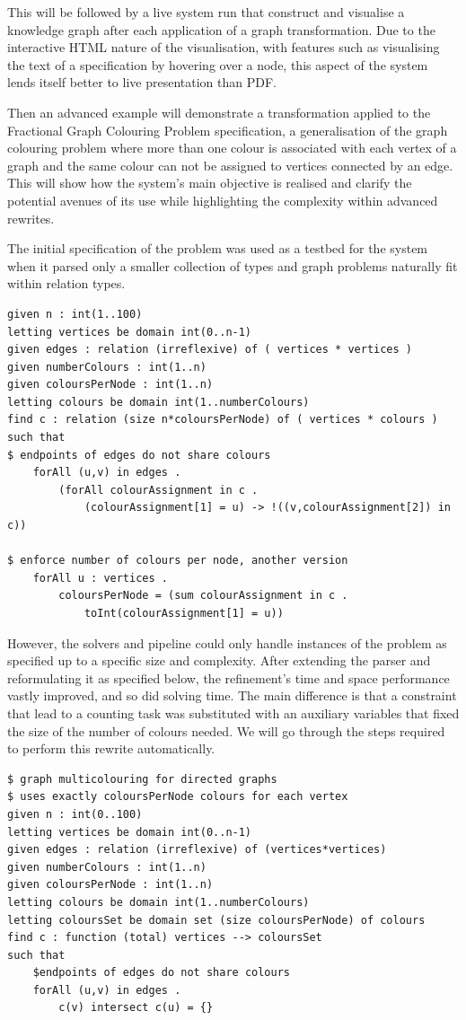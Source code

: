 \documentclass[runningheads]{llncs}
\begin{document}
This will be followed by a live system run that construct and visualise a knowledge graph after each application of a graph transformation. Due to the interactive HTML nature of the visualisation, with features such as visualising the text of a specification by hovering over a node, this aspect of the system lends itself better to live presentation than PDF.

Then an advanced example will demonstrate a transformation applied to the Fractional Graph Colouring Problem specification, a generalisation of the graph colouring problem where more than one colour is associated with each vertex of a graph and the same colour can not be assigned to vertices connected by an edge. This will show how the system's main objective is realised and clarify the potential avenues of its use while highlighting the complexity within advanced rewrites.

The initial specification of the problem was used as a testbed for the system when it parsed only a smaller collection of types and graph problems naturally fit within relation types.

\begin{lstlisting}
given n : int(1..100)
letting vertices be domain int(0..n-1)
given edges : relation (irreflexive) of ( vertices * vertices )
given numberColours : int(1..n)
given coloursPerNode : int(1..n)
letting colours be domain int(1..numberColours)
find c : relation (size n*coloursPerNode) of ( vertices * colours )
such that
$ endpoints of edges do not share colours
    forAll (u,v) in edges .
        (forAll colourAssignment in c .
            (colourAssignment[1] = u) -> !((v,colourAssignment[2]) in c))

$ enforce number of colours per node, another version
    forAll u : vertices .
        coloursPerNode = (sum colourAssignment in c .
            toInt(colourAssignment[1] = u))
\end{lstlisting}


However, the solvers and pipeline could only handle instances of the problem as specified up to a specific size and complexity. 
After extending the parser and reformulating it as specified below, the refinement's time and space performance vastly improved, and so did solving time.
The main difference is that a constraint that lead to a counting task was substituted with an auxiliary variables that fixed the size of the number of colours needed. We will go through the steps required to perform this rewrite automatically.

\begin{lstlisting}
$ graph multicolouring for directed graphs
$ uses exactly coloursPerNode colours for each vertex
given n : int(0..100)
letting vertices be domain int(0..n-1)
given edges : relation (irreflexive) of (vertices*vertices)
given numberColours : int(1..n)
given coloursPerNode : int(1..n)
letting colours be domain int(1..numberColours)
letting coloursSet be domain set (size coloursPerNode) of colours
find c : function (total) vertices --> coloursSet
such that
    $endpoints of edges do not share colours
    forAll (u,v) in edges .
        c(v) intersect c(u) = {}
\end{lstlisting}
\end{document}

